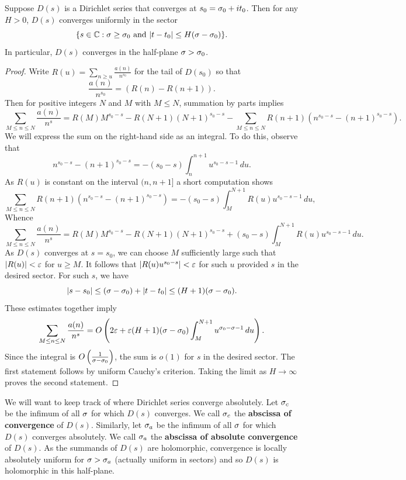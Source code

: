     \begin{theorem}\label{thm:convergence_of_Dirichlet_series}
      Suppose \(D(s)\) is a Dirichlet series that converges at \(s_{0} = \sigma_{0}+it_{0}\). Then for any \(H > 0\), \(D(s)\) converges uniformly in the sector
      \[
        \{s \in \mathbb{C}:\sigma \ge \sigma_{0} \text{ and } |t-t_{0}| \le H(\sigma-\sigma_{0})\}.
      \]
      In particular, \(D(s)\) converges in the half-plane \(\sigma > \sigma_{0}\).
    \end{theorem}
    \begin{proof}
      Write \(R(u) = \sum_{n \ge u}\frac{a(n)}{n^{s_{0}}}\) for the tail of \(D(s_{0})\) so that
      \[
        \frac{a(n)}{n^{s_{0}}} = (R(n)-R(n+1)).
      \]
      Then for positive integers \(N\) and \(M\) with \(M \le N\), summation by parts implies
      \[
        \sum_{M \le n \le N}\frac{a(n)}{n^{s}} = R(M)M^{s_{0}-s}-R(N+1)(N+1)^{s_{0}-s}-\sum_{M \le n \le N}R(n+1)(n^{s_{0}-s}-(n+1)^{s_{0}-s}).
      \]
      We will express the sum on the right-hand side as an integral. To do this, observe that
      \[
        n^{s_{0}-s}-(n+1)^{s_{0}-s} = -(s_{0}-s)\int_{n}^{n+1}u^{s_{0}-s-1}\,du.
      \]
      As \(R(u)\) is constant on the interval \((n,n+1]\) a short computation shows
      \[
        \sum_{M \le n \le N}R(n+1)(n^{s_{0}-s}-(n+1)^{s_{0}-s}) = -(s_{0}-s)\int_{M}^{N+1}R(u)u^{s_{0}-s-1}\,du,
      \]
      Whence
      \[
        \sum_{M \le n \le N}\frac{a(n)}{n^{s}} = R(M)M^{s_{0}-s}-R(N+1)(N+1)^{s_{0}-s}+(s_{0}-s)\int_{M}^{N+1}R(u)u^{s_{0}-s-1}\,du.
      \]
      As \(D(s)\) converges at \(s = s_{0}\), we can choose \(M\) sufficiently large such that \(|R(u)| < \varepsilon\) for \(u \ge M\). It follows that \(|R(u)u^{s_{0}-s}| < \varepsilon\) for such \(u\) provided \(s\) in the desired sector. For such \(s\), we have
      \[
        |s-s_{0}| \le (\sigma-\sigma_{0})+|t-t_{0}| \le (H+1)(\sigma-\sigma_{0}).
      \]
      These estimates together imply
      \[
        \sum_{M \le n \le N}\frac{a(n)}{n^{s}} = O\left(2\varepsilon+\varepsilon(H+1)(\sigma-\sigma_{0})\int_{M}^{N+1}u^{\sigma_{0}-\sigma-1}\,du\right).
      \]
      Since the integral is \(O\left(\frac{1}{\sigma-\sigma_{0}}\right)\), the sum is \(o(1)\) for \(s\) in the desired sector. The first statement follows by uniform Cauchy's criterion. Taking the limit as \(H \to \infty\) proves the second statement. 
    \end{proof}
    
    We will want to keep track of where Dirichlet series converge absolutely. Let \(\sigma_{c}\) be the infimum of all \(\sigma\) for which \(D(s)\) converges. We call \(\sigma_{c}\) the \textbf{abscissa of convergence} of \(D(s)\). Similarly, let \(\sigma_{a}\) be the infimum of all \(\sigma\) for which \(D(s)\) converges absolutely. We call \(\sigma_{a}\) the \textbf{abscissa of absolute convergence} of \(D(s)\). As the summands of \(D(s)\) are holomorphic, convergence is locally absolutely uniform for \(\sigma > \sigma_{a}\) (actually uniform in sectors) and so \(D(s)\) is holomorphic in this half-plane.  
    

